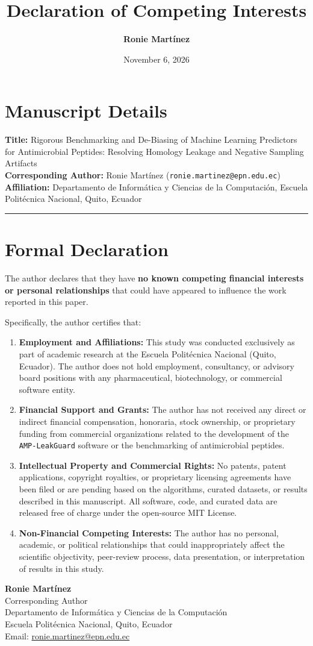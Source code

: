 \documentclass[11pt,a4paper]{article}
\title{\textbf{Declaration of Competing Interests}}
\author{\textbf{Ronie Martínez}}
\date{November 6, 2026}
\begin{document}
\maketitle

\section*{Manuscript Details}
\textbf{Title:} Rigorous Benchmarking and De-Biasing of Machine Learning Predictors for Antimicrobial Peptides: Resolving Homology Leakage and Negative Sampling Artifacts\\
\textbf{Corresponding Author:} Ronie Martínez (\texttt{ronie.martinez@epn.edu.ec})\\
\textbf{Affiliation:} Departamento de Informática y Ciencias de la Computación, Escuela Politécnica Nacional, Quito, Ecuador

\vspace{0.5cm}
\hrule
\vspace{0.5cm}

\section*{Formal Declaration}

The author declares that they have \textbf{no known competing financial interests or personal relationships} that could have appeared to influence the work reported in this paper.

Specifically, the author certifies that:
\begin{enumerate}
    \item \textbf{Employment and Affiliations:} This study was conducted exclusively as part of academic research at the Escuela Politécnica Nacional (Quito, Ecuador). The author does not hold employment, consultancy, or advisory board positions with any pharmaceutical, biotechnology, or commercial software entity.
    \item \textbf{Financial Support and Grants:} The author has not received any direct or indirect financial compensation, honoraria, stock ownership, or proprietary funding from commercial organizations related to the development of the \texttt{AMP-LeakGuard} software or the benchmarking of antimicrobial peptides.
    \item \textbf{Intellectual Property and Commercial Rights:} No patents, patent applications, copyright royalties, or proprietary licensing agreements have been filed or are pending based on the algorithms, curated datasets, or results described in this manuscript. All software, code, and curated data are released free of charge under the open-source MIT License.
    \item \textbf{Non-Financial Competing Interests:} The author has no personal, academic, or political relationships that could inappropriately affect the scientific objectivity, peer-review process, data presentation, or interpretation of results in this study.
\end{enumerate}

\vspace{1.0cm}

\noindent\textbf{Ronie Martínez}\\
Corresponding Author\\
Departamento de Informática y Ciencias de la Computación\\
Escuela Politécnica Nacional, Quito, Ecuador\\
Email: \href{mailto:ronie.martinez@epn.edu.ec}{ronie.martinez@epn.edu.ec}
\end{document}
